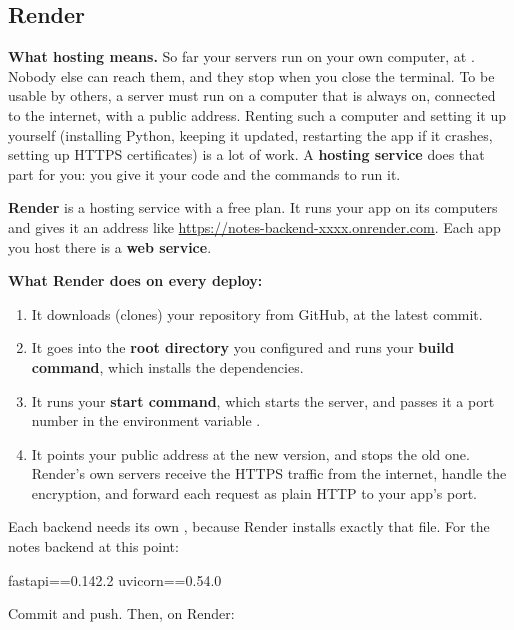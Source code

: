 \subsection{Render}

\textbf{What hosting means.} So far your servers run on your own computer, at . Nobody else can reach them, and they stop when you close the terminal. To be usable by others, a server must run on a computer that is always on, connected to the internet, with a public address. Renting such a computer and setting it up yourself (installing Python, keeping it updated, restarting the app if it crashes, setting up HTTPS certificates) is a lot of work. A \textbf{hosting service} does that part for you: you give it your code and the commands to run it.

\textbf{Render} is a hosting service with a free plan. It runs your app on its computers and gives it an address like \url{https://notes-backend-xxxx.onrender.com}. Each app you host there is a \textbf{web service}.

\textbf{What Render does on every deploy:}
\begin{enumerate}
\item It downloads (clones) your repository from GitHub, at the latest commit.
\item It goes into the \textbf{root directory} you configured and runs your \textbf{build command}, which installs the dependencies.
\item It runs your \textbf{start command}, which starts the server, and passes it a port number in the environment variable .
\item It points your public address at the new version, and stops the old one. Render's own servers receive the HTTPS traffic from the internet, handle the encryption, and forward each request as plain HTTP to your app's port.
\end{enumerate}

Each backend needs its own , because Render installs exactly that file. For the notes backend at this point:

\begin{code}
fastapi==0.142.2
uvicorn==0.54.0
\end{code}

Commit and push. Then, on Render:


